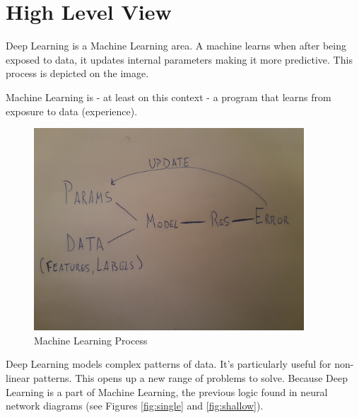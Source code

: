 \section{High Level View}
Deep Learning is a Machine Learning area. A machine learns when after being exposed to data, it updates internal parameters making it more predictive. This process is depicted on the image. 

Machine Learning is - at least on this context -  a program that learns from exposure to data (experience).

\begin{figure}[h]
 \centering
 \includegraphics[width=0.9\textwidth]{ML.jpg}
 \caption{Machine Learning Process}
\end{figure}

Deep Learning models complex patterns of data. It's particularly useful for non-linear patterns. This opens up a new range of problems to solve. Because Deep Learning is a part of Machine Learning, the previous logic found in neural network diagrams (see Figures \ref{fig:single} and \ref{fig:shallow}).


